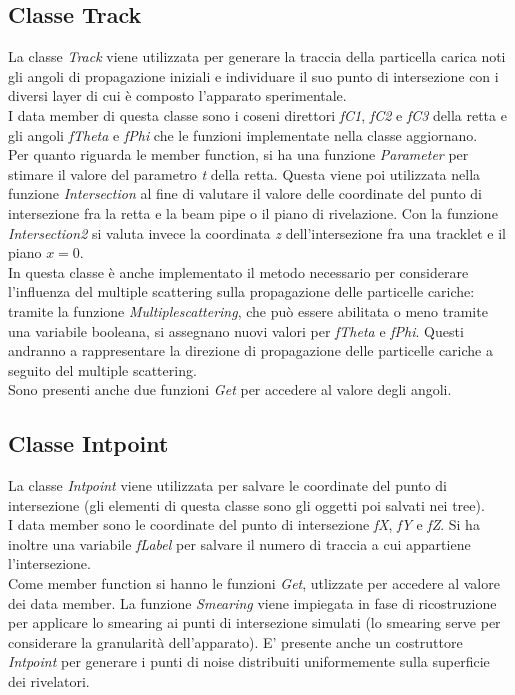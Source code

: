 \documentclass{article}
\begin{document}
\subsection{Classe Track}
La classe \textit{Track} viene utilizzata per generare la traccia della particella carica noti gli angoli di propagazione iniziali e individuare il suo punto di intersezione con i diversi layer di cui è composto l'apparato sperimentale. 
\\
I data member di questa classe sono i coseni direttori \textit{fC1}, \textit{fC2} e \textit{fC3} della retta e gli angoli \textit{fTheta} e \textit{fPhi} che le funzioni implementate nella classe aggiornano. \\
Per quanto riguarda le member function, si ha una funzione \textit{Parameter} per stimare il valore del parametro \textit{t} della retta. Questa viene poi utilizzata nella funzione \textit{Intersection} al fine di valutare il valore delle coordinate del punto di intersezione fra la retta e la beam pipe o il piano di rivelazione.
Con la funzione  \textit{Intersection2} si valuta invece la coordinata \textit{z} dell'intersezione fra una tracklet e il piano $x=0$. 
\\
In questa classe è anche implementato il metodo necessario per considerare l'influenza del multiple scattering sulla propagazione delle particelle cariche: tramite la funzione \textit{Multiplescattering}, che può essere abilitata o meno tramite una variabile booleana, si assegnano nuovi valori per \textit{fTheta} e \textit{fPhi}. Questi andranno a rappresentare la direzione di propagazione delle particelle cariche a seguito del multiple scattering.
\\
Sono presenti anche due funzioni \textit{Get} per accedere al valore degli angoli.

\subsection{Classe Intpoint}
La classe \textit{Intpoint} viene utilizzata per salvare le coordinate del punto di intersezione (gli elementi di questa classe sono gli oggetti poi salvati nei tree). 
\\
I data member sono le coordinate del punto di intersezione \textit{fX}, \textit{fY} e \textit{fZ}. Si ha inoltre una variabile \textit{fLabel} per salvare il numero di traccia a cui appartiene l'intersezione. 
\\
Come member function si hanno le funzioni \textit{Get}, utlizzate per accedere al valore dei data member. La funzione \textit{Smearing} viene impiegata in fase di ricostruzione per applicare lo smearing ai punti di intersezione simulati (lo smearing serve per considerare la granularità dell'apparato). E' presente anche un costruttore \textit{Intpoint} per generare i punti di noise distribuiti uniformemente sulla superficie dei rivelatori.
\end{document}
